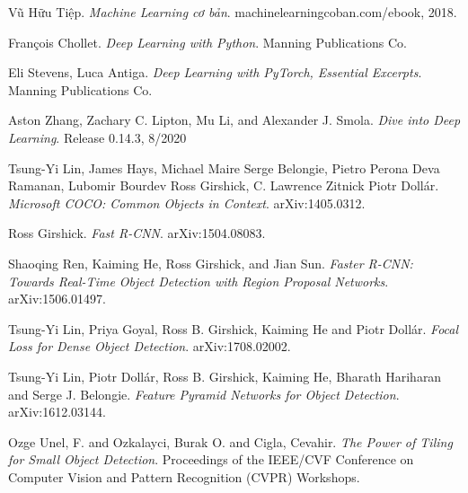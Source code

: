 \documentclass[a4paper, 12pt]{report}
\begin{document}
\begin{thebibliography}{9}
	Vũ Hữu Tiệp. 
	\textit{Machine Learning cơ bản}. machinelearningcoban.com/ebook, 2018.
	
	François Chollet. 
	\textit{Deep Learning with Python}.  Manning Publications Co.
	
	Eli Stevens, Luca Antiga. 
	\textit{Deep Learning with PyTorch, Essential Excerpts}.  Manning Publications Co.
	
	Aston Zhang, Zachary C. Lipton, Mu Li, and Alexander J. Smola. 
	\textit{Dive into Deep Learning}. Release 0.14.3, 8/2020
	
	Tsung-Yi Lin,
	James Hays,
	Michael Maire Serge Belongie,
	Pietro Perona Deva Ramanan,
	Lubomir Bourdev Ross Girshick,
	C. Lawrence Zitnick Piotr Dollár. 
	\textit{Microsoft COCO: Common Objects in Context}.  
	arXiv:1405.0312.
	
	Ross Girshick. 
	\textit{Fast R-CNN}.  
	arXiv:1504.08083.
	
	Shaoqing Ren, Kaiming He, Ross Girshick, and Jian Sun. 
	\textit{Faster R-CNN: Towards Real-Time Object
		Detection with Region Proposal Networks}.  
	arXiv:1506.01497.
		
	Tsung{-}Yi Lin,
               Priya Goyal,
               Ross B. Girshick,
               Kaiming He and
               Piotr Doll{\'{a}}r.
	\textit{Focal Loss for Dense Object Detection}.  
	arXiv:1708.02002.
	
	Tsung{-}Yi Lin,
               Piotr Doll{\'{a}}r,
               Ross B. Girshick,
               Kaiming He,
               Bharath Hariharan and
               Serge J. Belongie.
	\textit{Feature Pyramid Networks for Object Detection}.  
	arXiv:1612.03144.
	
	Ozge Unel, F. and Ozkalayci, Burak O. and Cigla, Cevahir.
	\textit{The Power of Tiling for Small Object Detection}.  
	Proceedings of the IEEE/CVF Conference on Computer Vision and Pattern Recognition (CVPR) Workshops.
	
\end{thebibliography}
\end{document}
